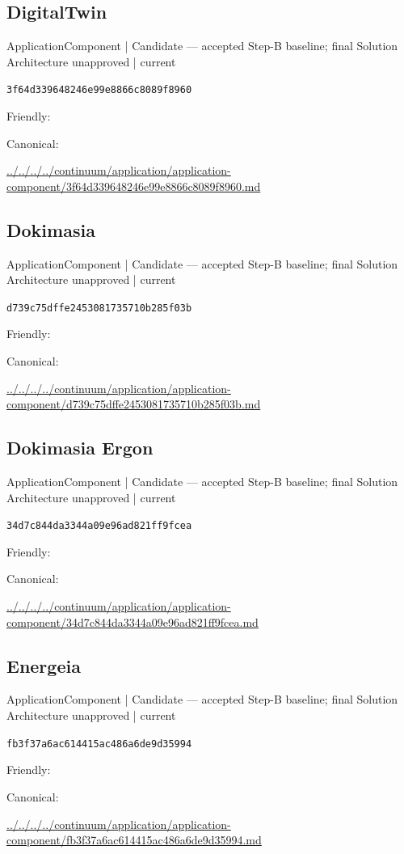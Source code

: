 \documentclass[10pt,a4paper]{article}
\begin{document}
\subsection*{DigitalTwin}
{\small ApplicationComponent | Candidate — accepted Step-B baseline; final Solution Architecture unapproved | current}\par
\texttt{3f64d339648246e99e8866c8089f8960}\par
Friendly: \par
Canonical: \par
{\footnotesize\url{../../../../continuum/application/application-component/3f64d339648246e99e8866c8089f8960.md}}\par
\subsection*{Dokimasia}
{\small ApplicationComponent | Candidate — accepted Step-B baseline; final Solution Architecture unapproved | current}\par
\texttt{d739c75dffe2453081735710b285f03b}\par
Friendly: \par
Canonical: \par
{\footnotesize\url{../../../../continuum/application/application-component/d739c75dffe2453081735710b285f03b.md}}\par
\subsection*{Dokimasia Ergon}
{\small ApplicationComponent | Candidate — accepted Step-B baseline; final Solution Architecture unapproved | current}\par
\texttt{34d7c844da3344a09e96ad821ff9fcea}\par
Friendly: \par
Canonical: \par
{\footnotesize\url{../../../../continuum/application/application-component/34d7c844da3344a09e96ad821ff9fcea.md}}\par
\subsection*{Energeia}
{\small ApplicationComponent | Candidate — accepted Step-B baseline; final Solution Architecture unapproved | current}\par
\texttt{fb3f37a6ac614415ac486a6de9d35994}\par
Friendly: \par
Canonical: \par
{\footnotesize\url{../../../../continuum/application/application-component/fb3f37a6ac614415ac486a6de9d35994.md}}\par
\end{document}
